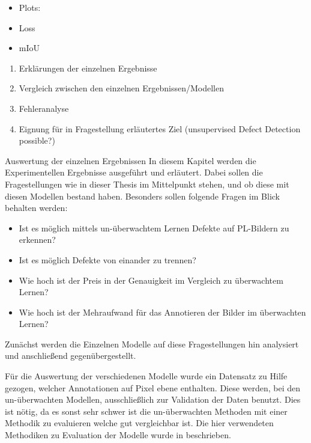 \iffalse


\begin{itemize}
    \item Plots:
        \item Loss
        \item mIoU
        
\end{itemize}

\begin{enumerate}
            \item Erklärungen der einzelnen Ergebnisse 
            \item Vergleich zwischen den einzelnen Ergebnissen/Modellen  
            \item Fehleranalyse
            \item Eignung für in Fragestellung erläutertes Ziel (unsupervised Defect Detection possible?)
\end{enumerate}




Auswertung der einzelnen Ergebnissen
In diesem Kapitel werden die Experimentellen Ergebnisse ausgeführt und erläutert. 
Dabei sollen die Fragestellungen wie in  dieser Thesis im Mittelpunkt stehen, und ob diese mit diesen Modellen bestand haben. 
Besonders sollen folgende Fragen im Blick behalten werden:

\begin{itemize}
    \item Ist es möglich mittels un-überwachtem Lernen Defekte auf PL-Bildern zu erkennen?
    \item Ist es möglich Defekte von einander zu trennen?
    \item Wie hoch ist der Preis in der Genauigkeit im Vergleich zu überwachtem Lernen?
    \item Wie hoch ist der Mehraufwand für das Annotieren der Bilder im überwachten Lernen?
\end{itemize}

Zunächst werden die Einzelnen Modelle auf diese Fragestellungen hin analysiert und anschließend gegenübergestellt.

Für die Auswertung der verschiedenen Modelle wurde ein Datensatz zu Hilfe gezogen, welcher Annotationen auf Pixel ebene enthalten. Diese werden, bei den un-überwachten Modellen, ausschließlich zur Validation der Daten benutzt. Dies ist nötig, da es sonst sehr schwer ist die un-überwachten Methoden mit einer  Methodik zu evaluieren welche gut vergleichbar ist. Die hier verwendeten Methodiken zu Evaluation der Modelle wurde in  beschrieben.     


